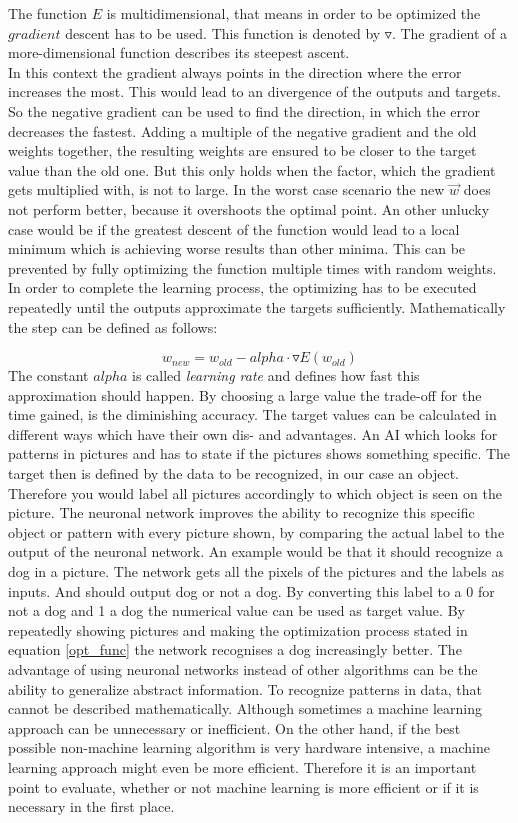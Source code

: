 \documentclass[12pt]{article}
\def\alpha{alpha}%
\begin{document}
The function $E$ is multidimensional, that means in order to be optimized the $gradient$ descent has to be used. This function is denoted by $\triangledown$. The gradient of a more-dimensional function describes its steepest ascent. \cite{grad} \\ In this context the gradient always points in the direction where the error increases the most. This would lead to an divergence of the outputs and targets. So the negative gradient can be used to find the direction, in which the error decreases the fastest. Adding a multiple of the negative gradient and the old weights together, the resulting weights are ensured to be closer to the target value than the old one. But this only holds when the factor, which the gradient gets multiplied with, is not to large. In the worst case scenario the new $\vec{w}$ does not perform better, because it overshoots the optimal point. An other unlucky case would be if the greatest descent of the function would lead to a local minimum which is achieving worse results than other minima. This can be prevented by fully optimizing the function multiple times with random weights. In order to complete the learning process, the optimizing has to be executed repeatedly until the outputs approximate the targets sufficiently. Mathematically the step can be defined as follows:

\begin{equation} \label{opt_func}
    w_{new} = w_{old} - \alpha \cdot \triangledown E(w_{old})
\end{equation}
The constant $\alpha$ is called \textit{learning rate} and defines how fast this approximation should happen. By choosing a large value the trade-off for the time gained, is the diminishing accuracy. The target values can be calculated in different ways which have their own dis- and advantages. An AI which looks for patterns in pictures and has to state if the pictures shows something specific. The target then is defined by the data to be recognized, in our case an object. Therefore you would label all pictures accordingly to which object is seen on the picture. The neuronal network improves the ability to recognize this specific object or pattern with every picture shown, by comparing the actual label to the output of the neuronal network. An example would be that it should recognize a dog in a picture. The network gets all the pixels of the pictures and the labels as inputs. And should output dog or not a dog. By converting this label to a 0 for not a dog and 1 a dog the numerical value can be used as target value. By repeatedly showing pictures and making the optimization process stated in equation \ref{opt_func} the network recognises a dog increasingly better.
The advantage of using neuronal networks instead of other algorithms can be the ability to generalize abstract information. To recognize patterns in data, that cannot be described mathematically. Although sometimes a machine learning approach can be unnecessary or inefficient. On the other hand, if the best possible non-machine learning algorithm is very hardware intensive, a machine learning approach might even be more efficient. Therefore it is an important point to evaluate, whether or not machine learning is more efficient or if it is necessary in the first place.
\end{document}
